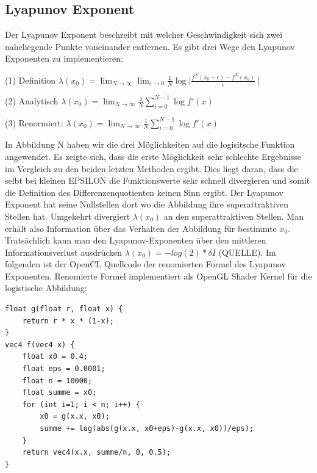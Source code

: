 \documentclass{scrartcl}
\begin{document}
\subsection{Lyapunov Exponent}
Der Lyapunov Exponent beschreibt mit welcher Geschwindigkeit sich zwei naheliegende Punkte voneinander entfernen. 
Es gibt drei Wege den Lyapunov Exponenten zu implementieren:

(1) Definition
$\lambda(x_0) = \lim_{N \rightarrow \infty}\lim_{\epsilon \rightarrow 0} \frac{1}{N}\log{\mid \frac{f^N(x_0+\epsilon)- f^N(x_0)}{\epsilon} \mid} $


(2) Analytisch
$\lambda(x_0) = \lim_{N \rightarrow \infty} \frac{1}{N} \sum_{i=0}^{N-1}  \log{f'(x)} $


(3) Renormiert:
$\lambda(x_0) = \lim_{N \rightarrow \infty} \frac{1}{N} \sum_{i=0}^{N-1}  \log{f'(x)} $


In Abbildung N haben wir die drei Möglichkeiten auf die logisitsche Funktion angewendet. Es zeigte sich, dass die erste Möglichkeit sehr schlechte Ergebnisse im Vergleich zu den beiden letzten Methoden ergibt. Dies liegt daran, dass die selbt bei kleinen EPSILON die Funktionswerte sehr schnell divergieren und somit die Definition des Differenzenquotienten keinen Sinn ergibt. 
Der Lyapunov Exponent hat seine Nullstellen dort wo die Abbildung ihre superattraktiven Stellen hat. Umgekehrt divergiert $\lambda(x_0)$ an den superattraktiven Stellen. Man erhält also Information über das Verhalten der Abbildung für bestimmte $x_0$. Tratsächlich kann man den Lyapunov-Exponenten über den mittleren Informationsverlust ausdrücken $\lambda(x_0)=-log(2)*\delta I$ (QUELLE). Im folgenden ist der OpenCL Quellcode der renomierten Formel des Lyapunov Exponenten.
Renomierte Formel implementiert als OpenGL Shader Kernel für die logistische Abbildung:
\begin{lstlisting}
float g(float r, float x) {
    return r * x * (1-x);
}
vec4 f(vec4 x) {
    float x0 = 0.4;
    float eps = 0.0001;
    float n = 10000;
    float summe = x0;
    for (int i=1; i < n; i++) {
        x0 = g(x.x, x0);
        summe += log(abs(g(x.x, x0+eps)-g(x.x, x0))/eps);
    }
    return vec4(x.x, summe/n, 0, 0.5);
}
\end{lstlisting}
 
\end{document}
